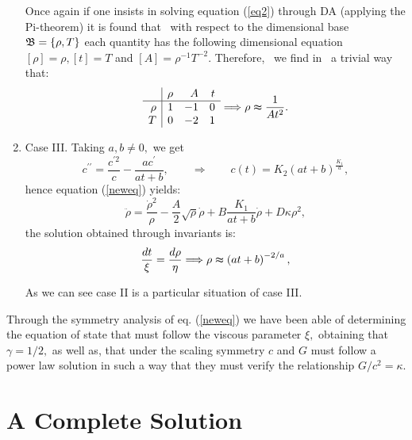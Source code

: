 \documentclass{revtex4}
\begin{document}
\begin{enumerate}
Once again if one insists in solving equation (\ref{eq2}) through DA
(applying the Pi-theorem) it is found that \ with respect to the dimensional
base $\frak{B}=\left\{ \rho ,T\right\} $ each quantity has the following
dimensional equation $\left[ \rho \right] =\rho ,\left[ t\right] =T$ and $%
\left[ A\right] =\rho ^{-1}T^{-2}.$ Therefore, \ we find in \ a trivial way
that:
\begin{equation}
\begin{array}{r|rrr}
& \rho  & A & t \\ \hline
\rho  & 1 & -1 & 0 \\
T & 0 & -2 & 1
\end{array}
\Longrightarrow \rho \thickapprox \frac{1}{At^{2}}.
\end{equation}

\item  Case III. Taking $a,b\neq 0,$ we get
\begin{equation}
c^{\prime \prime }=\frac{c^{\prime 2}}{c}-\frac{ac^{\prime }}{at+b},\qquad
\Longrightarrow \qquad c(t)=K_{2}\left( at+b\right) ^{\frac{K_{1}}{a}},
\label{c_3}
\end{equation}
hence equation (\ref{neweq}) yields:
\begin{equation}
\ddot{\rho}=\frac{\dot{\rho}^{2}}{\rho }-\frac{A}{2}\sqrt{\rho }\dot{\rho}+B%
\frac{K_{1}}{at+b}\dot{\rho}+D\kappa \rho ^{2},  \label{eq3}
\end{equation}
the solution obtained through invariants is:
\begin{equation}
\frac{dt}{\xi }=\frac{d\rho }{\eta }\Longrightarrow \rho \thickapprox \left(
at+b\right) ^{-2/a},  \label{sol_nl-c_3}
\end{equation}

As we can see case II is a particular situation of case III.
\end{enumerate}

Through the symmetry analysis of eq. (\ref{neweq}) we have been able of
determining the equation of state that must follow the viscous parameter $%
\xi ,$ obtaining that $\gamma =1/2,$ as well as, that under the scaling
symmetry $c$ and $G$ must follow a power law solution in such a way that
they must verify the relationship $G/c^{2}=\kappa .$

\section{A Complete Solution}
\end{document}
